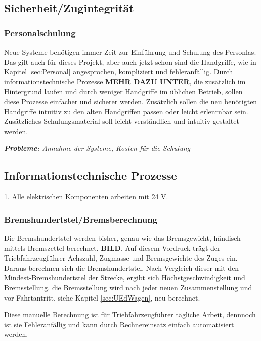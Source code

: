 \subsection{Sicherheit/Zugintegrität}
\subsubsection{Personalschulung}
Neue Systeme benötigen immer Zeit zur Einführung und Schulung des Personlas. Das gilt auch für dieses Projekt, aber auch jetzt schon sind die Handgriffe, wie in Kapitel \ref{sec:Personal} angesprochen, kompliziert und fehleranfällig. Durch informationstechnische Prozesse \textbf{MEHR DAZU UNTER}, die zusätzlich im Hintergrund laufen und durch weniger Handgriffe im üblichen Betrieb, sollen diese Prozesse einfacher und sicherer werden. Zusätzlich sollen die neu benötigten Handgriffe intuitiv zu den alten Handgriffen passen oder leicht erlenrnbar sein. Zusätzliches Schulungsmaterial soll leicht verständlich und intuitiv gestaltet werden.\par
\textit{\textbf{Probleme:} Annahme der Systeme, Kosten für die Schulung}

\subsection{Informationstechnische Prozesse}
1.	Alle elektrischen Komponenten arbeiten mit 24 V.
\subsubsection{Bremshundertstel/Bremsberechnung}
Die Bremshundertstel werden bisher, genau wie das Bremsgewicht, händisch mittels Bremszettel berechnet. \textbf{BILD}. Auf diesem Vordruck trägt der Triebfahrzeugführer Achszahl, Zugmasse und Bremsgewichte des Zuges ein. Daraus berechnen sich die Bremshundertstel. Nach Vergleich dieser mit den Mindest-Bremshundertstel der Strecke, ergibt sich Höchstgeschwindigkeit und Bremsstellung. die Bremsstellung wird nach jeder neuen Zusammenstellung und vor Fahrtantritt, siehe Kapitel \ref{sec:UEdWagen}, neu berechnet.\par
Diese manuelle Berechnung ist für Triebfahrzeugführer tägliche Arbeit, dennnoch ist sie Fehleranfällig und kann durch Rechnereinsatz einfach automatisiert werden.
